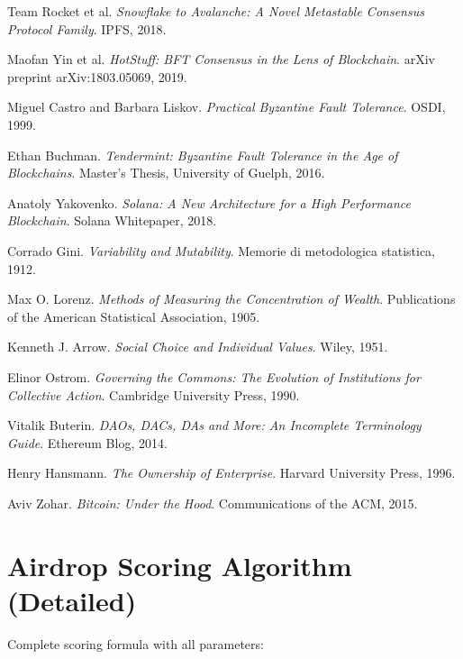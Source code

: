 \documentclass[11pt,letterpaper]{article}
\theoremstyle{definition}
\theoremstyle{remark}
\begin{document}
\begin{thebibliography}{99}
Team Rocket et al.
\textit{Snowflake to Avalanche: A Novel Metastable Consensus Protocol Family}.
IPFS, 2018.

Maofan Yin et al.
\textit{HotStuff: BFT Consensus in the Lens of Blockchain}.
arXiv preprint arXiv:1803.05069, 2019.

Miguel Castro and Barbara Liskov.
\textit{Practical Byzantine Fault Tolerance}.
OSDI, 1999.

Ethan Buchman.
\textit{Tendermint: Byzantine Fault Tolerance in the Age of Blockchains}.
Master's Thesis, University of Guelph, 2016.

Anatoly Yakovenko.
\textit{Solana: A New Architecture for a High Performance Blockchain}.
Solana Whitepaper, 2018.

Corrado Gini.
\textit{Variability and Mutability}.
Memorie di metodologica statistica, 1912.

Max O. Lorenz.
\textit{Methods of Measuring the Concentration of Wealth}.
Publications of the American Statistical Association, 1905.

Kenneth J. Arrow.
\textit{Social Choice and Individual Values}.
Wiley, 1951.

Elinor Ostrom.
\textit{Governing the Commons: The Evolution of Institutions for Collective Action}.
Cambridge University Press, 1990.

Vitalik Buterin.
\textit{DAOs, DACs, DAs and More: An Incomplete Terminology Guide}.
Ethereum Blog, 2014.

Henry Hansmann.
\textit{The Ownership of Enterprise}.
Harvard University Press, 1996.

Aviv Zohar.
\textit{Bitcoin: Under the Hood}.
Communications of the ACM, 2015.

\end{thebibliography}

\appendix

\section{Airdrop Scoring Algorithm (Detailed)}

Complete scoring formula with all parameters:
\end{document}

